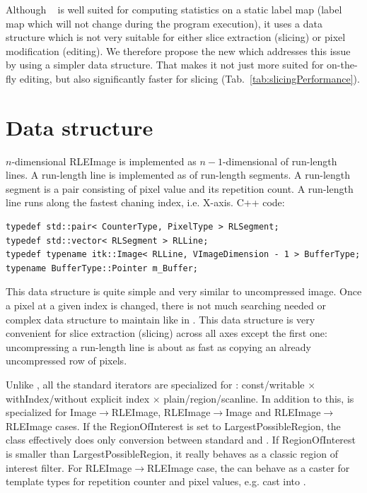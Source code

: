 \documentclass{InsightArticle}
\begin{document}
Although ~\cite{Lehmann2007} is well suited for
computing statistics on a static label map
(label map which will not change during the program execution),
it uses a data structure which is not very suitable for either
slice extraction (slicing) or pixel modification (editing).
We therefore propose the new  which addresses
this issue by using a simpler data structure.
That makes it not just more suited for on-the-fly editing,
but also significantly faster for slicing (Tab.~\ref{tab:slicingPerformance}).


\section{Data structure}

$n$-dimensional RLEImage is implemented as $n-1$-dimensional  of run-length lines.
A run-length line is implemented as  of run-length segments.
A run-length segment is a pair consisting of pixel value and its repetition count.
A run-length line runs along the fastest chaning index, i.e. X-axis. C++ code:

\begin{verbatim}
typedef std::pair< CounterType, PixelType > RLSegment;
typedef std::vector< RLSegment > RLLine;
typedef typename itk::Image< RLLine, VImageDimension - 1 > BufferType;
typename BufferType::Pointer m_Buffer;
\end{verbatim}

This data structure is quite simple and very similar to uncompressed image.
Once a pixel at a given index is changed, there is not much searching needed
or complex data structure to maintain like in .
This data structure is very convenient for slice extraction (slicing)
across all axes except the first one: uncompressing a run-length line
is about as fast as copying an already uncompressed row of pixels.

Unlike , all the standard iterators are specialized for :
const/\-writable $\times$ withIndex/\-without explicit index $\times$ plain/\-region/\-scanline.
In addition to this,  is specialized for
Image$\rightarrow$RLEImage, RLEImage$\rightarrow$Image and RLEImage$\rightarrow$RLEImage cases.
If the RegionOfInterest is set to LargestPossibleRegion, the class effectively
does only conversion between standard  and .
If RegionOfInterest is smaller than LargestPossibleRegion,
it really behaves as a classic region of interest filter.
For RLEImage$\rightarrow$RLEImage case, the 
can behave as a caster for template types for repetition counter and pixel values,
e.g. cast  into .
\end{document}
